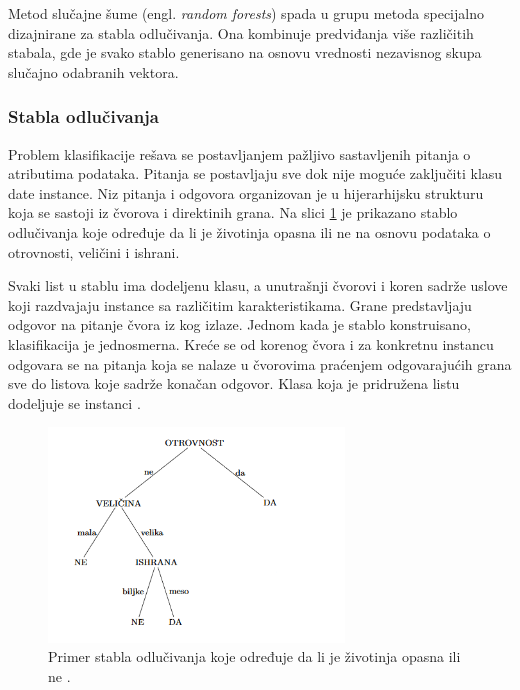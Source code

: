 Metod slučajne šume (engl. \textit{random forests}) spada u grupu metoda specijalno dizajnirane za stabla odlučivanja. Ona kombinuje predviđanja više različitih stabala, gde je svako stablo generisano na osnovu vrednosti nezavisnog skupa slučajno odabranih vektora.

\subsubsection{Stabla odlučivanja}
 
Problem klasifikacije rešava se postavljanjem pažljivo sastavljenih pitanja o atributima podataka. Pitanja se postavljaju sve dok nije moguće zaključiti klasu date instance. Niz pitanja i odgovora organizovan je u hijerarhijsku strukturu koja se sastoji iz čvorova i direktinih grana. Na slici \ref{fig:tree} je prikazano stablo odlučivanja koje određuje da li je životinja opasna ili ne na osnovu podataka o otrovnosti, veličini i ishrani. 

Svaki list u stablu ima dodeljenu klasu, a unutrašnji čvorovi i koren sadrže uslove koji razdvajaju instance sa različitim karakteristikama. Grane predstavljaju odgovor na pitanje čvora iz kog izlaze. Jednom kada je stablo konstruisano, klasifikacija je jednosmerna. Kreće se od korenog čvora i za konkretnu instancu odgovara se na pitanja koja se nalaze u čvorovima praćenjem odgovarajućih grana sve do listova koje sadrže konačan odgovor. Klasa koja je pridružena listu dodeljuje se instanci \cite{introDM}.


\begin{figure}[h]
	\centering
	\includegraphics[width=0.7\textwidth]{Figures/tree.png}
	\caption{Primer stabla odlučivanja koje određuje da li je životinja opasna ili ne \cite{vi}.}
	\label{fig:tree}
\end{figure}



